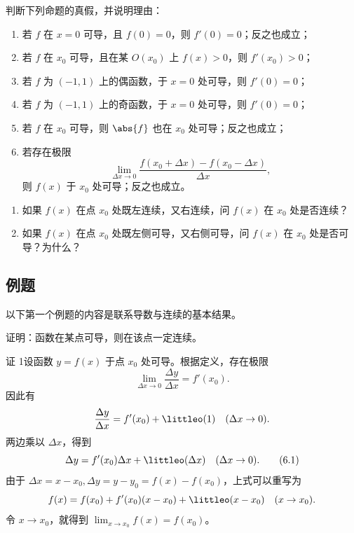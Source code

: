 \begin{xthought}[9]
判断下列命题的真假，并说明理由：
  \begin{enumerate}[label=(\arabic*)]
    \item 若 $f$ 在 $x=0$ 可导，且 $f(0)=0$，则 $f'(0)=0$；反之也成立；
    \item 若 $f$ 在 $x_0$ 可导，且在某 $O(x_0)$ 上 $f(x)>0$，则 $f'(x_0)>0$；
    \item 若 $f$ 为 $(-1,1)$ 上的偶函数，于 $x=0$ 处可导，则 $f'(0)=0$；
    \item 若 $f$ 为 $(-1,1)$ 上的奇函数，于 $x=0$ 处可导，则 $f'(0)=0$；
    \item 若 $f$ 在 $x_0$ 可导，则 $\abs{f}$ 也在 $x_0$ 处可导；反之也成立；
    \item 若存在极限
    \[
      \lim_{\Delta x\to0}\frac{f(x_0+\Delta x)-f(x_0-\Delta x)}{\Delta x},
    \]
    则 $f(x)$ 于 $x_0$ 处可导；反之也成立。
  \end{enumerate}
\end{xthought}

\begin{xthought}[10]
\begin{enumerate}[label=(\arabic*)]
    \item 如果 $f(x)$ 在点 $x_0$ 处既左连续，又右连续，问 $f(x)$ 在 $x_0$ 处是否连续？
    \item 如果 $f(x)$ 在点 $x_0$ 处既左侧可导，又右侧可导，问 $f(x)$ 在 $x_0$ 处是否可导？为什么？
  \end{enumerate}
\end{xthought}

\subsection{例题}

以下第一个例题的内容是联系导数与连续的基本结果。

\begin{xexample}[6.1.1]
证明：函数在某点可导，则在该点一定连续。
\end{xexample}
\begin{xproof}
证 1\quad 设函数 $y=f(x)$ 于点 $x_0$ 处可导。根据定义，存在极限
\[
  \lim_{\Delta x\to0}\frac{\Delta y}{\Delta x}=f'(x_0).
\]
因此有
\[
  \frac{\Delta y}{\Delta x}=f'(x_0)+\littleo(1)\quad(\Delta x\to0).
\]
两边乘以 $\Delta x$，得到
\begin{equation}
  \Delta y=f'(x_0)\Delta x+\littleo(\Delta x)\quad(\Delta x\to0).
  \tag{6.1}
  \label{eq:6.1}
\end{equation}
由于 $\Delta x=x-x_0,\Delta y=y-y_0=f(x)-f(x_0)$，上式可以重写为
\[
  f(x)=f(x_0)+f'(x_0)(x-x_0)+\littleo(x-x_0)\quad(x\to x_0).
\]
令 $x\to x_0$，就得到 $\lim_{x\to x_0}f(x)=f(x_0)$。
\end{xproof}

